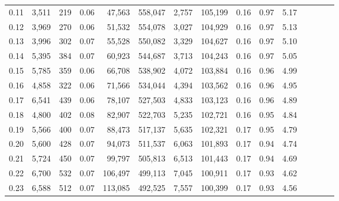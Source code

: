 \begin{tabular}{rrrcrrrrrrrrrrr}
0.11 &   3,511 &    219 &                                       0.06 &   47,563 &  558,047 &    2,757 &  105,199 &  0.16 &  0.97 &                         5.17 \\
0.12 &   3,969 &    270 &                                       0.06 &   51,532 &  554,078 &    3,027 &  104,929 &  0.16 &  0.97 &                         5.13 \\
0.13 &   3,996 &    302 &                                       0.07 &   55,528 &  550,082 &    3,329 &  104,627 &  0.16 &  0.97 &                         5.10 \\
0.14 &   5,395 &    384 &                                       0.07 &   60,923 &  544,687 &    3,713 &  104,243 &  0.16 &  0.97 &                         5.05 \\
0.15 &   5,785 &    359 &                                       0.06 &   66,708 &  538,902 &    4,072 &  103,884 &  0.16 &  0.96 &                         4.99 \\
0.16 &   4,858 &    322 &                                       0.06 &   71,566 &  534,044 &    4,394 &  103,562 &  0.16 &  0.96 &                         4.95 \\
0.17 &   6,541 &    439 &                                       0.06 &   78,107 &  527,503 &    4,833 &  103,123 &  0.16 &  0.96 &                         4.89 \\
0.18 &   4,800 &    402 &                                       0.08 &   82,907 &  522,703 &    5,235 &  102,721 &  0.16 &  0.95 &                         4.84 \\
0.19 &   5,566 &    400 &                                       0.07 &   88,473 &  517,137 &    5,635 &  102,321 &  0.17 &  0.95 &                         4.79 \\
0.20 &   5,600 &    428 &                                       0.07 &   94,073 &  511,537 &    6,063 &  101,893 &  0.17 &  0.94 &                         4.74 \\
0.21 &   5,724 &    450 &                                       0.07 &   99,797 &  505,813 &    6,513 &  101,443 &  0.17 &  0.94 &                         4.69 \\
0.22 &   6,700 &    532 &                                       0.07 &  106,497 &  499,113 &    7,045 &  100,911 &  0.17 &  0.93 &                         4.62 \\
0.23 &   6,588 &    512 &                                       0.07 &  113,085 &  492,525 &    7,557 &  100,399 &  0.17 &  0.93 &                         4.56 \\

\end{tabular}
